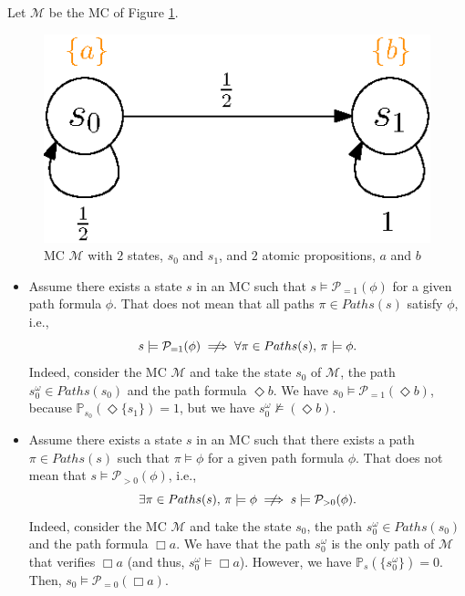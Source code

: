 \begin{remark}
Let $\mathcal{M}$ be the MC of Figure \ref{pctlctl}.
\begin{figure}[h]
  \centering
  \includegraphics[width=0.25\linewidth]{resources/PCTL_CTL}
  \captionsetup{justification=centering}
  \caption{MC $\mathcal{M}$ with $2$ states, $s_0$ and $s_1$, and $2$ atomic propositions, $a$ and $b$}\label{pctlctl}
\end{figure}
\begin{itemize}
  \item Assume there exists a state $s$ in an MC such that $s \models \mathcal{P}_{=1}(\phi)$ for a given path formula $\phi$. That does not mean that all paths $\pi \in Paths(s)$ satisfy $\phi$, i.e.,
  \[s \models \mathcal{P}_{=1}(\phi) \centernot\implies \forall \pi \in Paths(s), \, \pi \models \phi.\]
  Indeed, consider the MC $\mathcal{M}$ and take the state $s_0$ of $\mathcal{M}$, the path $s_0^\omega \in Paths(s_0)$ and the path formula $\Diamond b$. We have $s_0 \models \mathcal{P}_{=1}(\Diamond b)$, because $\mathbb{P}_{s_0}(\Diamond \{s_1\})=1$, but we have $s_0^\omega \not \models (\Diamond b)$.

  \item Assume there exists a state $s$ in an MC such that there exists a path $\pi \in Paths(s)$ such that $\pi \models \phi$ for a given path formula $\phi$.
  That does not mean that $s \models \mathcal{P}_{> 0}(\phi)$, i.e.,
  \[
    \exists \pi \in Paths(s),\, \pi \models \phi \centernot\implies s \models \mathcal{P}_{>0} (\phi).
  \]
  Indeed, consider the MC $\mathcal{M}$ and take the state $s_0$, the path $s_0^\omega \in Paths(s_0)$ and the path formula $\Box a$. We have that the path $s_0^\omega$ is the only path of $\mathcal{M}$ that verifies $\Box a$ (and thus, $s_0^\omega \models \Box a$).
  However, we have $\mathbb{P}_s(\{s_0^\omega\})=0$. Then, $s_0 \models \mathcal{P}_{=0} (\Box a)$.
\end{itemize}
\end{remark}

